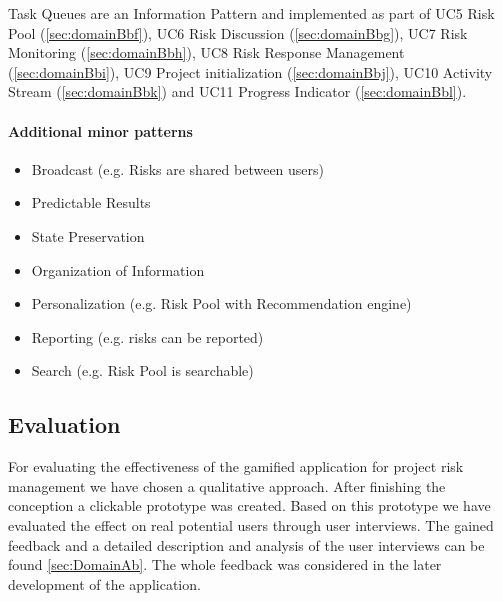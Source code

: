 Task Queues are an Information Pattern and implemented as part of \ac{UC}5 Risk Pool (\ref{sec:domainBbf}), \ac{UC}6 Risk Discussion (\ref{sec:domainBbg}), \ac{UC}7 Risk Monitoring (\ref{sec:domainBbh}), \ac{UC}8 Risk Response Management (\ref{sec:domainBbi}), \ac{UC}9 Project initialization (\ref{sec:domainBbj}), \ac{UC}10 Activity Stream (\ref{sec:domainBbk}) and \ac{UC}11 Progress Indicator (\ref{sec:domainBbl}).

\paragraph*{Additional minor patterns}

\begin{itemize}
	\item Broadcast (e.g. Risks are shared between users)
	\item Predictable Results
	\item State Preservation
	\item Organization of Information
	\item Personalization (e.g. Risk Pool with Recommendation engine)
	\item Reporting (e.g. risks can be reported)
	\item Search (e.g. Risk Pool is searchable)
\end{itemize}


\subsection{Evaluation}
\label{sec:domainCd}


For evaluating the effectiveness of the gamified application for project risk management we have chosen a qualitative approach. After finishing the conception a clickable prototype was created. Based on this prototype we have evaluated the effect on real potential users through user interviews. The gained feedback and a detailed description and analysis of the user interviews can be found \ref{sec:DomainAb}.
The whole feedback was considered in the later development of the application.